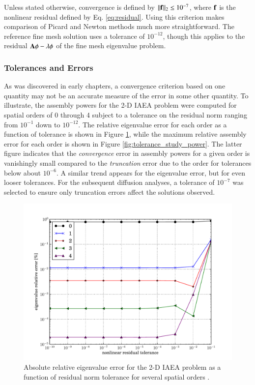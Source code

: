 Unless stated otherwise, 
convergence is defined by $||\mathbf{f}||_2 \leq 10^{-7}$, where
$\mathbf{f}$ is the nonlinear residual defined by Eq. \ref{eq:residual}.
Using this criterion makes comparison of Picard and Newton methods much 
more straightforward.  The reference fine mesh solution uses a tolerance 
of $10^{-12}$, though this applies to the 
residual $\mathbf{A}\phi-\lambda \phi$ of the fine mesh eigenvalue problem.

\subsubsection{Tolerances and Errors}

As was discovered in early chapters, a convergence criterion based on 
one quantity may not be an accurate measure of the error in some 
other quantity.  To illustrate, the assembly powers for the 2-D IAEA 
problem were computed for spatial orders of 0 through 4 subject to 
a tolerance on the residual norm ranging from $10^{-1}$ down to $10^{-12}$.
The relative eigenvalue error for each order as a function of 
tolerance is shown in Figure \ref{fig:tolerance_study_eigenvalue}, 
while the 
maximum relative assembly error for each order is shown in 
Figure \ref{fig:tolerance_study_power}.  The latter figure
indicates that the {\it convergence} error in assembly powers 
for a  given order is vanishingly small compared to 
the {\it truncation} error due to the order for tolerances
below about $10^{-6}$.  A similar trend appears for the eigenvalue 
error, but for even looser tolerances.  For the subsequent diffusion 
analyses, a tolerance of $10^{-7}$ was selected to ensure only 
truncation errors affect the solutions observed.

\begin{figure}[ht]
    \centering
    \includegraphics[keepaspectratio, width = 3.5 in]
                    {tolerance_study_eigenvalue}
    \caption{Absolute relative eigenvalue error for the 2-D IAEA 
             problem as a function of residual 
             norm tolerance for several spatial orders .}
    \label{fig:tolerance_study_eigenvalue}
\end{figure}

